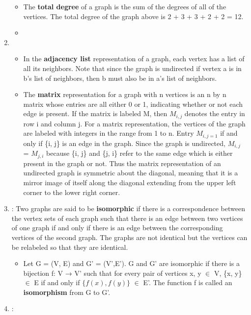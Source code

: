 \documentclass[12pt,a4paper]{article}
\begin{document}
\begin{enumerate}
\begin{itemize}
    \item The \textbf{total degree} of a graph is the sum of the degrees of all of the vertices. The total degree of the graph above is 2 + 3 + 3 + 2 + 2 = 12.
    \item[] 
  \end{itemize}
  \item {}
  \begin{itemize}
    \item In the \textbf{adjacency list} representation of a graph, each vertex has a list of all its neighbors. Note that since the graph is undirected if vertex a is in b's list of neighbors, then b must also be in a's list of neighbors.
    \item The \textbf{matrix} representation for a graph with n vertices is an n by n matrix whose entries are all either 0 or 1, indicating whether or not each edge is present. If the matrix is labeled M, then \(M_{i,j} \) denotes the entry in row i and column j. For a matrix representation, the vertices of the graph are labeled with integers in the range from 1 to n. Entry \(M_{i,j=1} \) if and only if \{i, j\} is an edge in the graph. Since the graph is undirected, \(M_{i,j} \) = \(M_{j,i} \) because \{i, j\} and \{j, i\} refer to the same edge which is either present in the graph or not. Thus the matrix representation of an undirected graph is symmetric about the diagonal, meaning that it is a mirror image of itself along the diagonal extending from the upper left corner to the lower right corner.
  \end{itemize}
  \item {}: Two graphs are said to be \textbf{isomorphic} if there is a correspondence between the vertex sets of each graph such that there is an edge between two vertices of one graph if and only if there is an edge between the corresponding vertices of the second graph. The graphs are not identical but the vertices can be relabeled so that they are identical.
  \begin{itemize}
    \item Let G = (V, E) and G' = (V',E').  G and G' are isomorphic if there is a bijection f: V → V' such that for every pair of vertices x, y \(\in \) V, \{x, y\} \(\in \) E if and only if \( \{f(x), f(y)\} \) \(\in \) E'. The function f is called an \textbf{isomorphism} from G to G'.
  \end{itemize}
  \item {}:

\end{enumerate}
\end{document}
